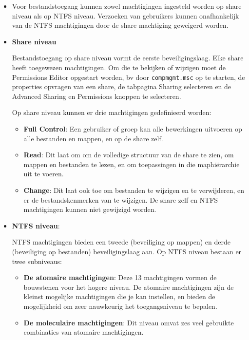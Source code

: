 \documentclass{report}
\begin{document}
\begin{enumerate}
{		}
		
		 { 
			\begin{itemize}
				\item Voor bestandstoegang kunnen zowel machtigingen ingesteld worden op share niveau als op NTFS niveau. Verzoeken van gebruikers kunnen onafhankelijk van de NTFS machtigingen door de share machtiging geweigerd worden. 
				\item \textbf{Share niveau}
				
				Bestandstoegang op share niveau vormt de eerste beveiligingslaag. Elke share heeft toegewezen machtigingen. Om die te bekijken of wijzigen moet de Permissions Editor opgestart worden, bv door \texttt{compmgmt.msc} op te starten, de properties opvragen van een share, de tabpagina Sharing selecteren en de Advanced Sharing en Permissions knoppen te selecteren.

				Op share niveau kunnen er drie machtigingen gedefinieerd worden:
				\begin{itemize}
					\item \textbf{Full Control}: Een gebruiker of groep kan alle bewerkingen uitvoeren op alle bestanden en mappen, en op de share zelf. 
					\item \textbf{Read}: Dit laat om om de volledige structuur van de share te zien, om mappen en bestanden te lezen, en om toepassingen in die maphiërarchie uit te voeren.
					\item \textbf{Change}: Dit laat ook toe om bestanden te wijzigen en te verwijderen, en er de bestandskenmerken van te wijzigen. De share zelf en NTFS machtigingen kunnen niet gewijzigd worden.
				\end{itemize}
				\item \textbf{NTFS niveau}:
				
				NTFS machtigingen bieden een tweede (beveiliging op mappen) en derde (beveiliging op bestanden) beveiligingslaag aan. Op NTFS niveau bestaan er twee subniveaus:
				\begin{itemize}
					\item \textbf{De atomaire machtigingen}: Deze 13 machtigingen vormen de bouwstenen voor het hogere niveau. De atomaire machtigingen zijn de kleinst mogelijke machtigingen die je kan instellen, en bieden de mogelijkheid om zeer nauwkeurig het toegangsniveau te bepalen. 
					\item \textbf{De moleculaire machtigingen}: Dit niveau omvat zes veel gebruikte combinaties van atomaire machtigingen. 
				\end{itemize}


\end{itemize}}
\end{enumerate}
\end{document}
